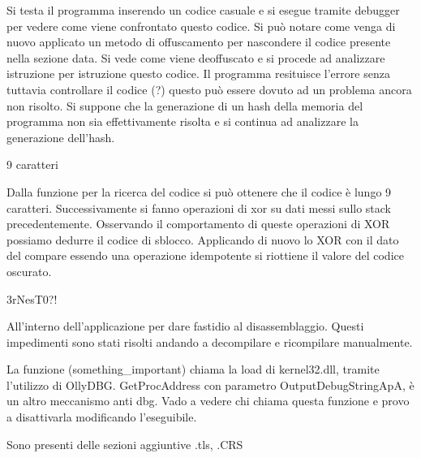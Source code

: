 \documentclass[a4paper,10pt]{article}
\begin{document}
Si testa il programma inserendo un codice casuale e si esegue tramite debugger per vedere come viene confrontato questo codice. Si può notare come venga di nuovo applicato un metodo di offuscamento per nascondere il codice presente nella sezione data. Si vede come viene deoffuscato e si procede ad analizzare istruzione per istruzione questo codice. Il programma resituisce l'errore senza tuttavia controllare il codice (?) questo può essere dovuto ad un problema ancora non risolto. Si suppone che la generazione di un hash della memoria del programma non sia effettivamente risolta e si continua ad analizzare la generazione dell'hash.


9 caratteri

Dalla funzione per la ricerca del codice si può ottenere che il codice è lungo 9 caratteri. Successivamente si fanno operazioni di xor su dati messi sullo stack precedentemente. Osservando il comportamento di queste operazioni di XOR possiamo dedurre il codice di sblocco. Applicando di nuovo lo XOR con il dato del compare essendo una operazione idempotente si riottiene il valore del codice oscurato.

3rNesT0?!

All'interno dell'applicazione per dare fastidio al disassemblaggio. Questi impedimenti sono stati risolti andando a decompilare e ricompilare manualmente.



La funzione (something\_important) chiama la load di kernel32.dll, tramite l'utilizzo di OllyDBG. GetProcAddress con parametro OutputDebugStringApA, è un altro meccanismo anti dbg. Vado a vedere chi chiama questa funzione e provo a disattivarla modificando l'eseguibile.

Sono presenti delle sezioni aggiuntive .tls, .CRS
\end{document}
